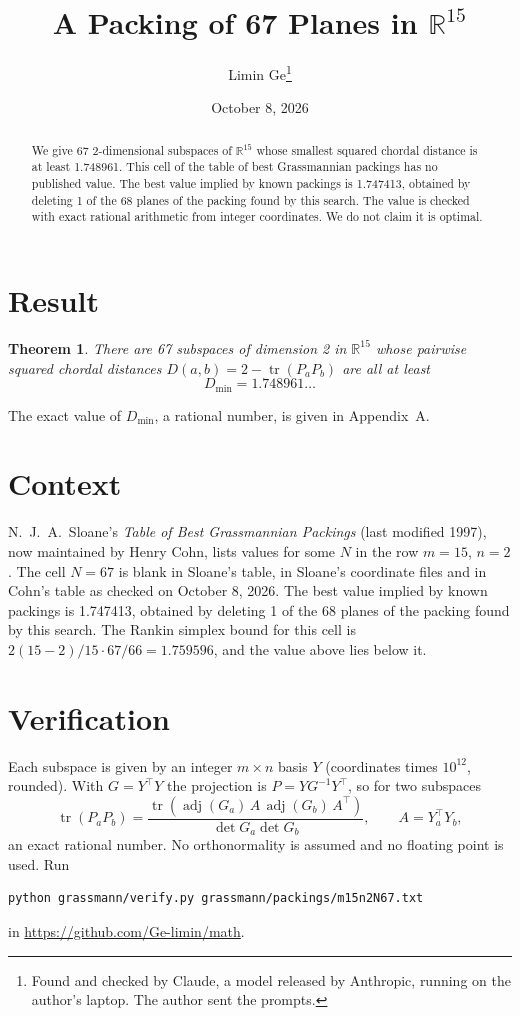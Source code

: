 \documentclass[11pt,a4paper]{article}
\title{A Packing of 67 Planes in $\mathbb{R}^{15}$}
\author{Limin Ge\thanks{Found and checked by Claude, a model released by Anthropic, running on the author's laptop. The author sent the prompts.}}
\date{October 8, 2026}
\newtheorem*{theorem}{Theorem}
\begin{document}
\maketitle
\begin{abstract}
We give 67 2-dimensional subspaces of $\mathbb{R}^{15}$ whose smallest squared chordal distance is at least 1.748961. This cell of the table of best Grassmannian packings has no published value. The best value implied by known packings is 1.747413, obtained by deleting 1 of the 68 planes of the packing found by this search. The value is checked with exact rational arithmetic from integer coordinates. We do not claim it is optimal.
\end{abstract}

\section{Result}
\begin{theorem}
There are 67 subspaces of dimension 2 in $\mathbb{R}^{15}$ whose pairwise squared chordal distances $D(a,b) = 2 - \operatorname{tr}(P_aP_b)$ are all at least
\[ D_{\min} = 1.748961\ldots \]
\end{theorem}
The exact value of $D_{\min}$, a rational number, is given in Appendix~A.


\section{Context}
N.~J.~A.~Sloane's \emph{Table of Best Grassmannian Packings} (last modified 1997), now maintained by Henry Cohn, lists values for some $N$ in the row $m=15$, $n=2$. The cell $N=67$ is blank in Sloane's table, in Sloane's coordinate files and in Cohn's table as checked on October 8, 2026. The best value implied by known packings is 1.747413, obtained by deleting 1 of the 68 planes of the packing found by this search. The Rankin simplex bound for this cell is $2(15-2)/15\cdot 67/66 = 1.759596$, and the value above lies below it.


\section{Verification}
Each subspace is given by an integer $m\times n$ basis $Y$ (coordinates times $10^{12}$, rounded). With $G=Y^\top Y$ the projection is $P=YG^{-1}Y^\top$, so for two subspaces
\[ \operatorname{tr}(P_aP_b)=\frac{\operatorname{tr}(\operatorname{adj}(G_a)\,A\,\operatorname{adj}(G_b)\,A^\top)}{\det G_a\det G_b},\qquad A=Y_a^\top Y_b, \]
an exact rational number. No orthonormality is assumed and no floating point is used. Run
\begin{verbatim}
python grassmann/verify.py grassmann/packings/m15n2N67.txt
\end{verbatim}
in \url{https://github.com/Ge-limin/math}.
\end{document}
